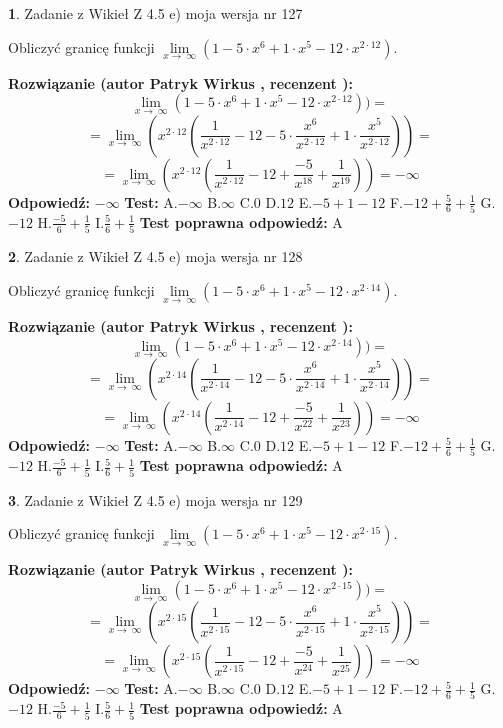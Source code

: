 \documentclass[12pt, a4paper]{article}
\theoremstyle{definition} %
\newtheorem{zad}{}
\newcommand{\zadStart}[1]{\begin{zad}#1\newline}
\newcommand{\zadStop}{\end{zad}}
\newcommand{\rozwStart}[2]{\noindent \textbf{Rozwiązanie (autor #1 , recenzent #2): }\newline}
\newcommand{\rozwStop}{\newline}
\newcommand{\odpStart}{\noindent \textbf{Odpowiedź:}\newline}
\newcommand{\odpStop}{\newline}
\newcommand{\testStart}{\noindent \textbf{Test:}\newline}
\newcommand{\testStop}{\newline}
\newcommand{\kluczStart}{\noindent \textbf{Test poprawna odpowiedź:}\newline}
\newcommand{\kluczStop}{\newline}
\begin{document}
\zadStart{Zadanie z Wikieł Z 4.5 e) moja wersja nr 127}



Obliczyć granicę funkcji  $\lim\limits_{x\to\ \infty}(1 - 5 \cdot x^{6}+1 \cdot x^{5}- 12 \cdot x^{2\cdot12})$.
\zadStop
\rozwStart{Patryk Wirkus}{}
$$\lim\limits_{x\to\ \infty}(1 - 5 \cdot x^{6}+1 \cdot x^{5}- 12 \cdot x^{2\cdot12}))=$$
$$=\lim\limits_{x\to\ \infty}(x^{2\cdot12}(\frac{1}{x^{2\cdot12}}-12 -5 \cdot \frac{x^{6}}{x^{2\cdot12}}+1 \cdot \frac{x^{5}}{x^{2\cdot12}}))=$$
$$=\lim\limits_{x\to\ \infty}(x^{2\cdot12}(\frac{1}{x^{2\cdot12}}-12 + \frac{-5}{x^{18}}+ \frac{1}{x^{19}}))=-\infty$$
\rozwStop
\odpStart
$-\infty$
\odpStop
\testStart
A.$-\infty$ B.$\infty$ C.$0$ D.$12$ E.$-5 + 1 - 12$
F.$-12+\frac{5}{6}+\frac{1}{5}$ G.$-12$
H.$\frac{-5}{6}+\frac{1}{5}$
I.$\frac{5}{6}+\frac{1}{5}$
\testStop
\kluczStart
A
\kluczStop



\zadStart{Zadanie z Wikieł Z 4.5 e) moja wersja nr 128}



Obliczyć granicę funkcji  $\lim\limits_{x\to\ \infty}(1 - 5 \cdot x^{6}+1 \cdot x^{5}- 12 \cdot x^{2\cdot14})$.
\zadStop
\rozwStart{Patryk Wirkus}{}
$$\lim\limits_{x\to\ \infty}(1 - 5 \cdot x^{6}+1 \cdot x^{5}- 12 \cdot x^{2\cdot14}))=$$
$$=\lim\limits_{x\to\ \infty}(x^{2\cdot14}(\frac{1}{x^{2\cdot14}}-12 -5 \cdot \frac{x^{6}}{x^{2\cdot14}}+1 \cdot \frac{x^{5}}{x^{2\cdot14}}))=$$
$$=\lim\limits_{x\to\ \infty}(x^{2\cdot14}(\frac{1}{x^{2\cdot14}}-12 + \frac{-5}{x^{22}}+ \frac{1}{x^{23}}))=-\infty$$
\rozwStop
\odpStart
$-\infty$
\odpStop
\testStart
A.$-\infty$ B.$\infty$ C.$0$ D.$12$ E.$-5 + 1 - 12$
F.$-12+\frac{5}{6}+\frac{1}{5}$ G.$-12$
H.$\frac{-5}{6}+\frac{1}{5}$
I.$\frac{5}{6}+\frac{1}{5}$
\testStop
\kluczStart
A
\kluczStop



\zadStart{Zadanie z Wikieł Z 4.5 e) moja wersja nr 129}



Obliczyć granicę funkcji  $\lim\limits_{x\to\ \infty}(1 - 5 \cdot x^{6}+1 \cdot x^{5}- 12 \cdot x^{2\cdot15})$.
\zadStop
\rozwStart{Patryk Wirkus}{}
$$\lim\limits_{x\to\ \infty}(1 - 5 \cdot x^{6}+1 \cdot x^{5}- 12 \cdot x^{2\cdot15}))=$$
$$=\lim\limits_{x\to\ \infty}(x^{2\cdot15}(\frac{1}{x^{2\cdot15}}-12 -5 \cdot \frac{x^{6}}{x^{2\cdot15}}+1 \cdot \frac{x^{5}}{x^{2\cdot15}}))=$$
$$=\lim\limits_{x\to\ \infty}(x^{2\cdot15}(\frac{1}{x^{2\cdot15}}-12 + \frac{-5}{x^{24}}+ \frac{1}{x^{25}}))=-\infty$$
\rozwStop
\odpStart
$-\infty$
\odpStop
\testStart
A.$-\infty$ B.$\infty$ C.$0$ D.$12$ E.$-5 + 1 - 12$
F.$-12+\frac{5}{6}+\frac{1}{5}$ G.$-12$
H.$\frac{-5}{6}+\frac{1}{5}$
I.$\frac{5}{6}+\frac{1}{5}$
\testStop
\kluczStart
A
\kluczStop
\end{document}

